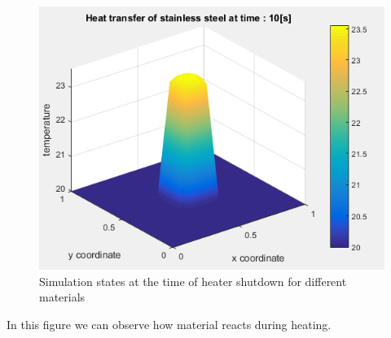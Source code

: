 \documentclass[a4paper,12pt]{article}
\begin{document}
\begin{figure}[H]
\includegraphics[scale=0.55]{2_steel_heater_stop}
\caption{Simulation states at the time of heater shutdown for different materials}
\centering
\end{figure}
In this figure we can observe how material reacts during heating.
\end{document}
